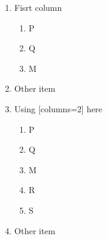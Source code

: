 \documentclass[12pt]{article}
\begin{document}
\begin{multicols}{2}
\begin{enumerate}[parsep=5pt,partopsep=0pt]
\item Fisrt column
  \begin{enumerate}[parsep=0pt,partopsep=0pt, topsep=5pt]%
     \item  P \item Q \item M
  \end{enumerate}
\item Other item

\columnbreak

\item Using [columns=2] here
\setlength{\multicolsep}{0pt}
\par\addvspace{10pt}
\raggedcolumns
\begin{multicols}{2}
  \begin{enumerate}[parsep=0pt,partopsep=0pt, topsep=5pt]%
     \item  P \item Q \item M\footnotemark
     \columnbreak
     \item R \item S
  \end{enumerate}
\end{multicols}
\par\addvspace{5pt}
\item Other item
\end{enumerate}
\end{multicols}
\end{document}
